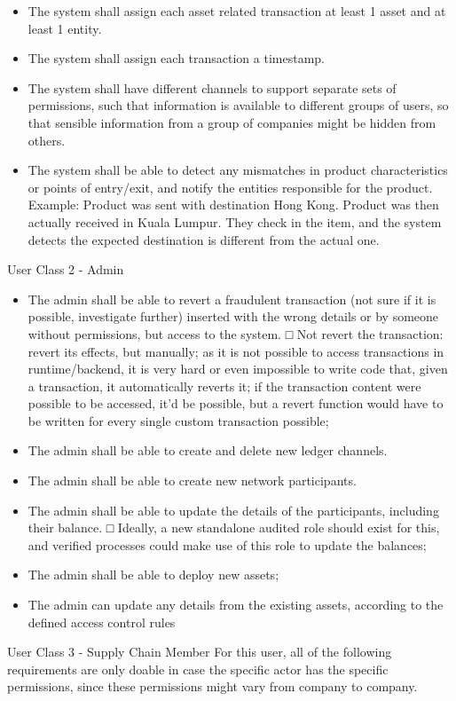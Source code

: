 \begin{itemize}
\begin{itemize}
			\item The system shall assign each asset related transaction at least 1 asset and  at least 1 entity.
			\item The system shall assign each transaction a timestamp.
			\item The system shall have different channels to support separate sets of permissions, such that information is available to different groups of users, so that sensible information from a group of companies might be hidden from others.
			\item The system shall be able to detect any mismatches in product characteristics or points of entry/exit, and notify the entities responsible for the product.
			Example: Product was sent with destination Hong Kong. Product was then actually received in Kuala Lumpur. They check in the item, and the system detects the expected destination is different from the actual one.
        \end{itemize}
        \par User Class 2 - Admin
        \begin{itemize}
			\item The admin shall be able to revert a fraudulent transaction (not sure if it is possible, investigate further) inserted with the wrong details or by someone without permissions, but access to the system.
				□ Not revert the transaction: revert its effects, but manually; as it is not possible to access transactions in runtime/backend, it is very hard or even impossible to write code that, given a transaction, it automatically reverts it; if the transaction content were possible to be accessed, it'd be possible, but a revert function would have to be written for every single custom transaction possible;
			\item The admin shall be able to create and delete new ledger channels.
			\item The admin shall be able to create new network participants.
			\item The admin shall be able to update the details of the participants, including their balance.
				□ Ideally, a new standalone audited role should exist for this, and verified processes could make use of this role to update the balances;
			\item The admin shall be able to deploy new assets;
			\item The admin can update any details from the existing assets, according to the defined access control rules
		\end{itemize}
		\par User Class 3 - Supply Chain Member
        For this user, all of the following requirements are only doable in case the specific actor has the specific permissions, since these permissions might vary from company to company.
        

\end{itemize}
